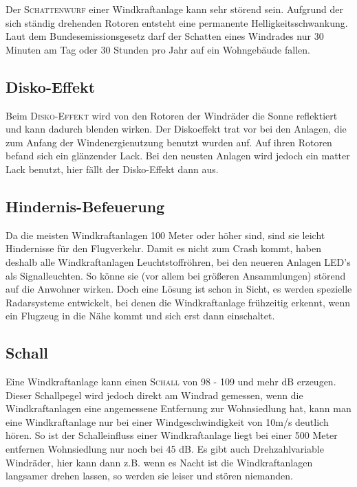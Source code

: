 \documentclass[12pt]{scrbook}
\begin{document}
Der \textsc{Schattenwurf} einer Windkraftanlage kann sehr störend sein. Aufgrund der
sich ständig drehenden Rotoren entsteht eine permanente Helligkeitsschwankung.
Laut dem Bundesemissionsgesetz darf der Schatten eines Windrades nur 30
Minuten am Tag oder 30 Stunden pro Jahr auf ein Wohngebäude fallen.


\subsection{Disko-Effekt}

Beim \textsc{Disko-Effekt} wird von den Rotoren der Windräder die Sonne reflektiert und
kann dadurch blenden wirken. Der Diskoeffekt trat vor bei den Anlagen, die zum
Anfang der Windenergienutzung benutzt wurden auf. Auf ihren Rotoren befand
sich ein glänzender Lack. Bei den neusten Anlagen wird jedoch ein matter Lack
benutzt, hier fällt der Disko-Effekt dann aus.

\subsection{Hindernis-Befeuerung}

Da die meisten Windkraftanlagen 100 Meter oder höher sind, sind sie leicht
Hindernisse für den Flugverkehr. Damit es nicht zum Crash kommt, haben deshalb
alle Windkraftanlagen Leuchtstoffröhren, bei den neueren Anlagen LED's als
Signalleuchten. So könne sie (vor allem bei größeren Ansammlungen) störend auf
die Anwohner wirken. Doch eine Lösung ist schon in Sicht, es werden spezielle
Radarsysteme entwickelt, bei denen die Windkraftanlage frühzeitig erkennt,
wenn ein Flugzeug in die Nähe kommt und sich erst dann einschaltet.


\subsection{Schall}

Eine Windkraftanlage kann einen \textsc{Schall} von 98 - 109 und mehr dB erzeugen.
Dieser Schallpegel wird jedoch direkt am Windrad gemessen, wenn die
Windkraftanlagen eine angemessene Entfernung zur Wohnsiedlung hat, kann man
eine Windkraftanlage nur bei einer Windgeschwindigkeit von 10m/s deutlich
hören. So ist der Schalleinfluss einer Windkraftanlage liegt bei einer 500
Meter entfernen Wohnsiedlung nur noch bei 45 dB. Es gibt auch Drehzahlvariable
Windräder, hier kann dann z.B. wenn es Nacht ist die Windkraftanlagen
langsamer drehen lassen, so werden sie leiser und stören niemanden.
\end{document}
